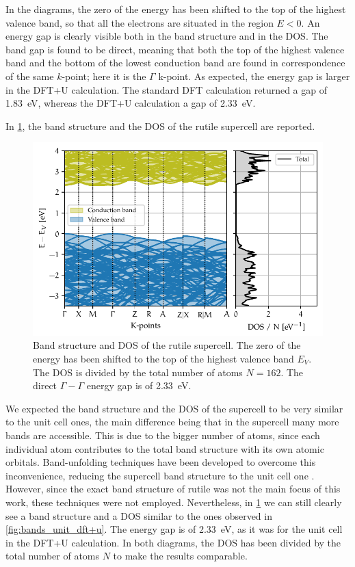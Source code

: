 In the diagrams, the zero of the energy has been shifted to the top of the highest valence band, so that all the electrons are situated in the region $E < 0$. An energy gap is clearly visible both in the band structure and in the DOS. The band gap is found to be direct, meaning that both the top of the highest valence band and the bottom of the lowest conduction band are found in correspondence of the same $k$-point; here it is the $\Gamma$ k-point. As expected, the energy gap is larger in the DFT+U calculation. The standard DFT calculation returned a gap of \SI{1.83}{eV}, whereas the DFT+U calculation a gap of \SI{2.33}{eV}.

In \cref{fig:bands_super}, the band structure and the DOS of the rutile supercell are reported.
\begin{figure}
    \centering
    \includegraphics[width=\textwidth]{figures/super.pdf}
    \caption[Band structure and DOS of the rutile supercell]{Band structure and DOS of the rutile supercell. The zero of the energy has been shifted to the top of the highest valence band $E_V$. The DOS is divided by the total number of atoms $N = 162$. The direct $\Gamma - \Gamma$ energy gap is of \SI{2.33}{eV}.}
    \label{fig:bands_super}
\end{figure}
We expected the band structure and the DOS of the supercell to be very similar to the unit cell ones, the main difference being that in the supercell many more bands are accessible. This is due to the bigger number of atoms, since each individual atom contributes to the total band structure with its own atomic orbitals. Band-unfolding techniques have been developed to overcome this inconvenience, reducing the supercell band structure to the unit cell one \cite{mayo2020}. However, since the exact band structure of rutile was not the main focus of this work, these techniques were not employed. Nevertheless, in \cref{fig:bands_super} we can still clearly see a band structure and a DOS similar to the ones observed in \cref{fig:bands_unit_dft+u}. The energy gap is of \SI{2.33}{eV}, as it was for the unit cell in the DFT+U calculation.
In both diagrams, the DOS has been divided by the total number of atoms $N$ to make the results comparable.

